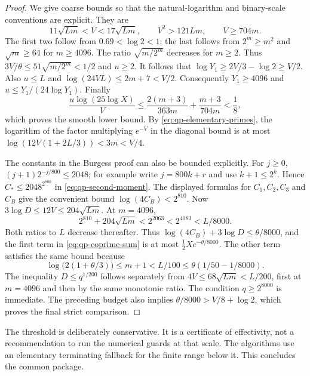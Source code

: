 \begin{proof}
We give coarse bounds so that the natural-logarithm and binary-scale
conventions are explicit.  They are
\[
 11\sqrt{Lm}<V<17\sqrt{Lm},\qquad
 V^2>121Lm,\qquad V\geq704m.
\]
The first two follow from $0.69<\log2<1$; the last follows from
$2^m\geq m^2$ and $\sqrt m\geq64$ for $m\geq4096$.
The ratio $\sqrt{m/2^m}$ decreases for $m\geq2$.
Thus $3V/\theta\leq51\sqrt{m/2^m}<1/2$ and $u\geq2$.
It follows that
$\log Y_1\geq2V/3-\log2\geq V/2$.
Also $u\leq L$ and
$\log(24VL)\leq2m+7<V/2$.
Consequently $Y_1\geq4096$ and
$u\leq Y_1/(24\log Y_1)$.
Finally
\[
 \frac{u\log(25\log X)}V
 \leq\frac{2(m+3)}{363m}+\frac{m+3}{704m}<\frac18,
\]
which proves the smooth lower bound.  By
\eqref{eq:qp-elementary-primes}, the logarithm of the factor multiplying
$e^{-V}$ in the diagonal bound is at most
$\log(12V(1+2L/3))<3m<V/4$.

The constants in the Burgess proof can also be bounded explicitly.
For $j\geq0$, $(j+1)2^{-j/800}\leq2048$; for example write
$j=800k+r$ and use $k+1\leq2^k$.
Hence $C_*\leq2048^{2^{800}}$ in
\eqref{eq:qp-second-moment}.  The displayed formulas for $C_1,C_2,C_3$
and $C_B$ give the convenient bound
$\log(4C_B)<2^{810}$.
Now $3\log D\leq12V\leq204\sqrt{Lm}$.
At $m=4096$,
\[
 2^{810}+204\sqrt{Lm}<2^{2063}
       <2^{4083}<L/8000.
\]
Both ratios to $L$ decrease thereafter.  Thus
$\log(4C_B)+3\log D\leq\theta/8000$,
and the first term in \eqref{eq:qp-coprime-sum} is at most
$\frac12Xe^{-\theta/8000}$.
The other term satisfies the same bound because
\[
 \log\bigl(2(1+\theta/3)\bigr)\leq m+1
 <L/100\leq\theta(1/50-1/8000).
\]
The inequality $D\leq q^{1/200}$ follows separately from
$4V\leq68\sqrt{Lm}<L/200$, first at $m=4096$ and then by the same
monotonic ratio.  The condition $q\geq2^{8000}$ is immediate.
The preceding budget also implies
$\theta/8000>V/8+\log2$, which proves the final strict comparison.
\end{proof}

The threshold is deliberately conservative.  It is a certificate of
effectivity, not a recommendation to run the numerical guards at that
scale.  The algorithms use an elementary terminating fallback for the
finite range below it.  This concludes the common package.
